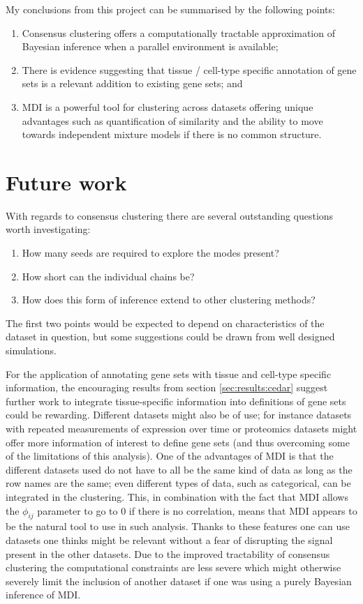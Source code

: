 \documentclass[12pt]{article} %
\begin{document}
	My conclusions from this project can be summarised by the following points:
	\begin{enumerate}
		\item Consensus clustering offers a computationally tractable approximation of Bayesian inference when a parallel environment is available; 
		\item There is evidence suggesting that tissue / cell-type specific annotation of gene sets is a relevant addition to existing gene sets; and
		\item MDI is a powerful tool for clustering across datasets offering unique advantages such as quantification of similarity and the ability to move towards independent mixture models if there is no common structure.
	\end{enumerate} 
	
	\section{Future work}
	With regards to consensus clustering there are several outstanding questions worth investigating:
	\begin{enumerate}
		\item How many seeds are required to explore the modes present?
		\item How short can the individual chains be?
		\item How does this form of inference extend to other clustering methods?
	\end{enumerate}
	The first two points would be expected to depend on characteristics of the dataset in question, but some suggestions could be drawn from well designed simulations.
	
	For the application of annotating gene sets with tissue and cell-type specific information, the encouraging results from section \ref{sec:results:cedar} suggest further work to integrate tissue-specific information into definitions of gene sets could be rewarding. Different datasets might also be of use; for instance datasets with repeated measurements of expression over time or proteomics datasets might offer more information of interest to define gene sets (and thus overcoming some of the limitations of this analysis). One of the advantages of MDI is that the different datasets used do not have to all be the same kind of data as long as the row names are the same; even different types of data, such as categorical, can be integrated in the clustering. This, in combination with the fact that MDI allows the $\phi_{ij}$ parameter to go to 0 if there is no correlation, means that MDI appears to be the natural tool to use in such analysis. Thanks to these features one can use datasets one thinks might be relevant without a fear of disrupting the signal present in the other datasets. Due to the improved tractability of consensus clustering the computational constraints are less severe which might otherwise severely limit the inclusion of another dataset if one was using a purely Bayesian inference of MDI.
	
\end{document}
